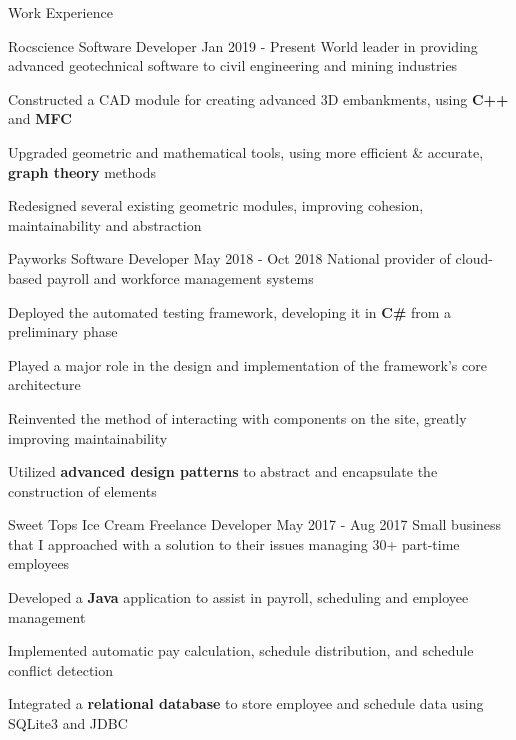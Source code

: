 \documentclass{resume} %
\begin{document}
\begin{rSection}{Work Experience}
    
    \begin{workexperience}
        {Rocscience}
        {Software Developer}
        {Jan 2019 - Present}
        {World leader in providing advanced geotechnical software to civil engineering and mining industries}
        {
            \item Constructed a CAD module for creating advanced 3D embankments, using \textbf{C++} and \textbf{MFC}
            \item Upgraded geometric and mathematical tools, using more efficient \& accurate, \textbf{graph theory} methods
            \item Redesigned several existing geometric modules, improving cohesion, maintainability and abstraction
        }
    \end{workexperience}

    \begin{workexperience}
        {Payworks}
        {Software Developer}
        {May 2018 - Oct 2018}
        {National provider of cloud-based payroll and workforce management systems}
        {
            \item Deployed the automated testing framework, developing it in \textbf{C\#} from a preliminary phase
            \item Played a major role in the design and implementation of the framework's core architecture
            \item Reinvented the method of interacting with components on the site, greatly improving maintainability
            \item Utilized \textbf{advanced design patterns} to abstract and encapsulate the construction of elements
        }
    \end{workexperience}

    \begin{workexperience}
        {Sweet Tops Ice Cream}
        {Freelance Developer}
        {May 2017 - Aug 2017}
        {Small business that I approached with a solution to their issues managing 30+ part-time employees}
        {
            \item Developed a \textbf{Java} application to assist in payroll, scheduling and employee management
            \item Implemented automatic pay calculation, schedule distribution, and schedule conflict detection
            \item Integrated a \textbf{relational database} to store employee and schedule data using SQLite3 and JDBC
        }
    \end{workexperience}

\end{rSection}
\end{document}
